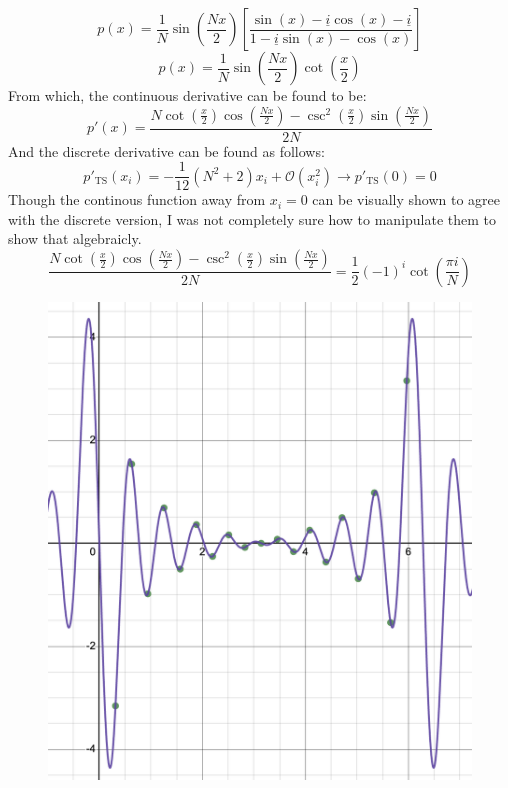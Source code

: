 \documentclass[10pt, reqno]{amsart}
\begin{document}
\begin{multicols}{2}
\begin{equation}
    \end{equation}
    \begin{equation}
        p(x) = \frac{1}{N} \sin \left( \frac{N x}{2} \right) \left[ \frac{\sin(x) - \underline{i} \cos(x) - \underline{i}}{1 - \underline{i} \sin(x) - \cos(x)} \right]
    \end{equation}
    \begin{equation}
        p(x) = \frac{1}{N}\sin \left( \frac{N x}{2} \right) \cot \left( \frac{x}{2} \right)
    \end{equation}
    From which, the continuous derivative can be found to be:
    \begin{equation}
        p'(x) = \frac{N \cot \left( \frac{x}{2} \right) \cos \left( \frac{Nx}{2} \right) - \csc^2 \left( \frac{x}{2} \right) \sin \left( \frac{Nx}{2} \right)}{2N}
    \end{equation}
    And the discrete derivative can be found as follows:
    \begin{equation}
        p'_{\mathrm{TS}}(x_i) = -\frac{1}{12} (N^2 + 2) x_i + \mathcal{O}(x_i^2) \to p'_{\mathrm{TS}}(0) = 0
    \end{equation}
    Though the continous function away from $x_i = 0$ can be visually shown to agree with the discrete version, I was not completely sure how to manipulate them to show that algebraicly.
    \begin{equation}
        \frac{N \cot \left( \frac{x}{2} \right) \cos \left( \frac{Nx}{2} \right) - \csc^2 \left( \frac{x}{2} \right) \sin \left( \frac{Nx}{2} \right)}{2N} = \frac{1}{2} (-1)^i \cot \left( \frac{\pi i}{N} \right)
    \end{equation}

    \begin{figure}[H]
        \centering
        \includegraphics[width = 0.7\linewidth]{DFT Proof by Desmos.png}
    \end{figure}


\end{multicols}
\end{document}
